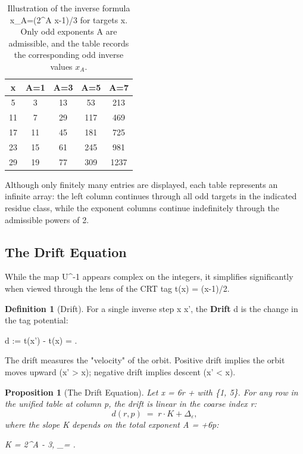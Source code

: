 \documentclass[11pt,letterpaper]{amsart}
\def\({}%
\def\){}%
\def\[{ }%
\def\]{ }%
\theoremstyle{definition}
\newtheorem{definition}{Definition}
\theoremstyle{plain}
\newtheorem{proposition}{Proposition}
\theoremstyle{plain}
\theoremstyle{remark}
\begin{document}
\begin{table}[h]
\centering
\begin{tabular}{c|cccc}
\(x\equiv 5\pmod 6\) &
\(\displaystyle A=1\) &
\(\displaystyle A=3\) &
\(\displaystyle A=5\) &
\(\displaystyle A=7\) \\
\hline
\(5\)  & \(3\)  & \(13\)  & \(53\)   & \(213\) \\
\(11\) & \(7\)  & \(29\)  & \(117\)  & \(469\) \\
\(17\) & \(11\) & \(45\)  & \(181\)  & \(725\) \\
\(23\) & \(15\) & \(61\)  & \(245\)  & \(981\) \\
\(29\) & \(19\) & \(77\)  & \(309\)  & \(1237\)
\end{tabular}
\caption{Illustration of the inverse formula
\(\displaystyle x_A=(2^A x-1)/3\) for targets \(x\).
Only odd exponents \(A\) are admissible, and the table records the
corresponding odd inverse values $x_A$.}
\label{tab:inverse-parity-odd-family}
\end{table}

Although only finitely many entries are displayed, each table represents
an infinite array: the left column continues through all odd targets in
the indicated residue class, while the exponent columns continue
indefinitely through the admissible powers of \(2\).


\subsection{The Drift Equation}
\label{subsec:drift}

While the map \(U^{-1}\) appears complex on the integers, it simplifies significantly when viewed through the lens of the CRT tag \(t(x) = (x-1)/2\).

\begin{definition}[Drift]
For a single inverse step \(x  x'\), the \textbf{Drift} \(d\) is the change in the tag potential:
\[
d \;:=\; t(x') - t(x) \;=\; .
\]
\end{definition}

The drift measures the "velocity" of the orbit. Positive drift implies the orbit moves upward (\(x' > x\)); negative drift implies descent (\(x' < x\)).

\begin{proposition}[The Drift Equation]
\label{prop:drift-equation}
Let \(x = 6r + \varepsilon\) with \(\varepsilon \in \{1, 5\}\). For any row in the unified table at column \(p\), the drift is linear in the coarse index \(r\):
\begin{equation}
d(r, p) \;=\; r \cdot K + \Delta_\varepsilon,
\end{equation}
where the slope \(K\) depends on the total exponent \(A = \alpha+6p\):
\[
K = 2^A - 3, \qquad \Delta_\varepsilon = .
\]
\end{proposition}
\end{document}
